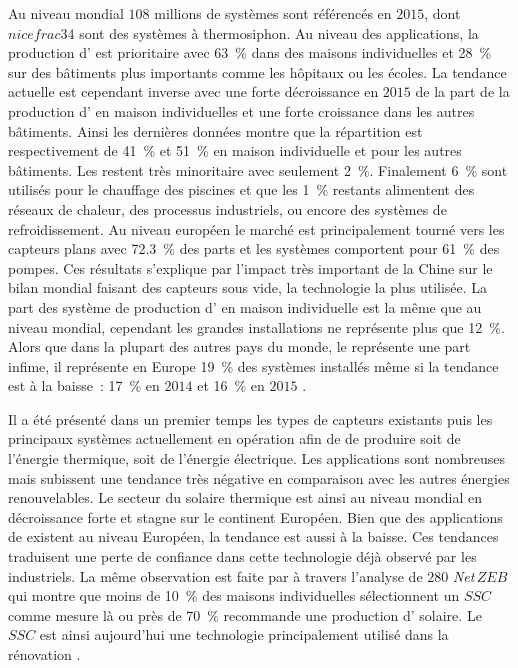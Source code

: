 
Au niveau mondial $108$ millions de systèmes sont référencés en $2015$, dont $nicefrac{3}{4}$
sont des systèmes à thermosiphon.
Au niveau des applications, la production d’ est prioritaire avec \SI{63}{\percent}
dans des maisons individuelles et \SI{28}{\percent} sur des bâtiments plus importants comme
les hôpitaux ou les écoles. La tendance actuelle est cependant inverse avec une forte
décroissance en $2015$ de la part de la production d’ en maison individuelles
et une forte croissance dans les autres bâtiments. Ainsi les dernières données montre que
la répartition est respectivement de \SI{41}{\percent} et \SI{51}{\percent} en maison
individuelle et pour les autres bâtiments.
Les  restent très minoritaire avec seulement \SI{2}{\percent}.
Finalement \SI{6}{\percent} sont utilisés pour le chauffage des piscines et que les \SI{1}{\percent}
restants alimentent des réseaux de chaleur, des processus industriels, ou encore des systèmes de
refroidissement.
Au niveau européen le marché est principalement tourné vers les capteurs plans avec \SI{72.3}{\percent}
des parts et les systèmes comportent pour \SI{61}{\percent} des pompes.
Ces résultats s’explique par l’impact très important de la Chine sur le bilan mondial faisant
des capteurs sous vide, la technologie la plus utilisée.
La part des système de production d’ en maison individuelle est la même que au niveau mondial,
cependant les grandes installations ne représente plus que \SI{12}{\percent}. Alors que
dans la plupart des autres pays du monde, le  représente une part infime, il
représente en Europe \SI{19}{\percent} des systèmes installés même si la tendance est à
la baisse~: \SI{17}{\percent} en $2014$ \parencite{Mauthner2016} et \SI{16}{\percent} en
$2015$ \parencite{Weiss2017}.

Il a été présenté dans un premier temps les types de capteurs existants puis les
principaux  systèmes actuellement en opération afin de de produire soit de l’énergie
thermique, soit de l’énergie électrique. Les applications sont nombreuses mais subissent
une tendance très négative en comparaison avec les autres énergies renouvelables. Le
secteur du solaire thermique est ainsi au niveau mondial en décroissance forte et stagne
sur le continent Européen. Bien que des applications de  existent au niveau
Européen, la tendance est aussi à la baisse. Ces tendances traduisent une perte de
confiance dans cette technologie déjà observé par les industriels. La même observation
est faite par \textcite{Musall2010} à travers l’analyse de $280$ \textit{Net}\,$ZEB$ qui
montre que moins de \SI{10}{\percent} des maisons individuelles sélectionnent un $SSC$
comme mesure là ou près de \SI{70}{\percent} recommande une production d’
solaire. Le $SSC$ est ainsi aujourd’hui une technologie principalement utilisé dans la rénovation
\parencite{Ellehauge2003}.


